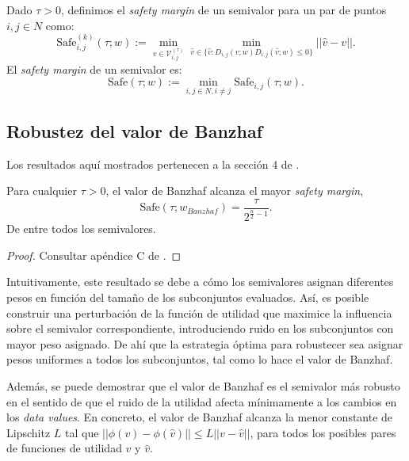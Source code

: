 \begin{definition}
  Dado $\tau > 0$, definimos el \emph{safety margin} de un
  semivalor para un par de puntos $i,j \in N$ como:
  \begin{equation*}
    \text{Safe}_{i,j}^{(k)}(\tau;w):=\min_{v \in \mathcal{V}_{i,j}^{(\tau)}}
    \min_{\hat{v} \in \{\hat{v}:D_{i,j}(v;w)D_{i,j}(\hat{v};w)\leq 0\}}
    ||\hat{v} - v||.
  \end{equation*}
  El \emph{safety margin} de un semivalor es:
  \begin{equation*}
    \text{Safe}(\tau;w):=\min_{i,j \in N, i \neq j} \text{Safe}_{i,j}(\tau;w).
  \end{equation*}
\end{definition}



\subsection{Robustez del valor de Banzhaf}
Los resultados aquí mostrados pertenecen a la sección 4
de \cite{dataBanzhaf}.

\begin{theorem}
  Para cualquier $\tau > 0$, el valor de Banzhaf
  alcanza el mayor \textit{safety margin},
  \[
  \text{Safe}(\tau;w_{Banzhaf})=\frac{\tau}{2^{\frac{n}{2}-1}}.  
  \]
  De entre todos los semivalores.
\end{theorem}

\begin{proof}
  Consultar apéndice C de \cite{dataBanzhaf}.
\end{proof}

Intuitivamente, este resultado se debe a cómo los
semivalores asignan diferentes pesos en función del
tamaño de los subconjuntos evaluados. Así, es posible
construir una perturbación de la función de utilidad
que maximice la influencia sobre el semivalor
correspondiente, introduciendo ruido en los subconjuntos
con mayor peso asignado. De ahí que la estrategia
óptima para robustecer sea asignar pesos uniformes a
todos los subconjuntos, tal como lo hace el valor de Banzhaf.

Además, se puede demostrar que el valor de Banzhaf es
el semivalor más robusto en el sentido de que el ruido
de la utilidad afecta mínimamente a los cambios en los
\textit{data values}. En concreto, el valor de
Banzhaf alcanza la menor constante de Lipschitz $L$
tal que $||\phi(v)-\phi(\hat{v})|| \leq L||v-\hat{v}||$,
para todos los posibles pares de funciones de utilidad
$v$ y $\hat{v}$.

